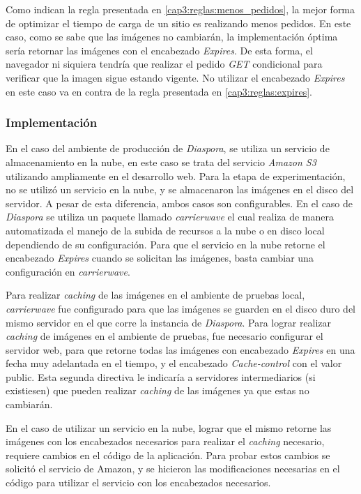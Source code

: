 Como indican la regla presentada en \ref{cap3:reglas:menos_pedidos}, la mejor forma de optimizar el tiempo de carga de un sitio es realizando menos pedidos. En este caso, como se sabe que las imágenes no cambiarán, la implementación óptima sería retornar las imágenes con el encabezado \emph{Expires}. De esta forma, el navegador ni siquiera tendría que
realizar el pedido \emph{GET} condicional para verificar que la imagen sigue estando vigente. No utilizar el encabezado \emph{Expires} en este caso va en contra de la
regla presentada en \ref{cap3:reglas:expires}.

\subsubsection{Implementación}

En el caso del ambiente de producción de \emph{Diaspora}, se utiliza un servicio de almacenamiento en la nube, en este caso se trata del servicio \emph{Amazon S3} utilizando
ampliamente en el desarrollo web. Para la etapa de experimentación, no se utilizó un servicio en la nube, y se almacenaron las imágenes en el disco del servidor.
A pesar de esta diferencia, ambos casos son configurables. En el caso de \emph{Diaspora} se utiliza un paquete llamado \emph{carrierwave} el cual realiza de manera automatizada el manejo
de la subida de recursos a la nube o en disco local dependiendo de su configuración. Para que el servicio en la nube retorne el encabezado \emph{Expires} cuando se solicitan
las imágenes, basta cambiar una configuración en \emph{carrierwave}.

Para realizar \emph{caching} de las imágenes en el ambiente de pruebas local, \emph{carrierwave} fue configurado para que las imágenes se guarden en el disco duro del mismo servidor
en el que corre la instancia de \emph{Diaspora}. Para lograr realizar \emph{caching} de imágenes en el ambiente de pruebas, fue necesario configurar el servidor web, para que retorne
todas las imágenes con encabezado \emph{Expires} en una fecha muy adelantada en el tiempo, y el encabezado \emph{Cache-control} con el valor public. Esta segunda directiva
le indicaría a servidores intermediarios (si existiesen) que pueden realizar \emph{caching} de las imágenes ya que estas no cambiarán.

En el caso de utilizar un servicio en la nube, lograr que el mismo retorne las imágenes con los encabezados necesarios para realizar el \emph{caching} necesario, requiere cambios
en el código de la aplicación. Para probar estos cambios se solicitó el servicio de Amazon, y se hicieron las modificaciones necesarias en el código para utilizar el servicio con
los encabezados necesarios.

